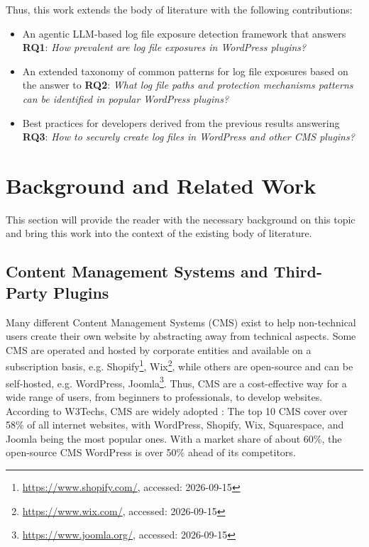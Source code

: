 \documentclass[sigconf]{acmart}
\begin{document}
Thus, this work extends the body of literature with the following contributions:
\begin{itemize}
    \item An agentic LLM-based log file exposure detection framework that answers \textbf{RQ1}: \emph{How prevalent are log file exposures in WordPress plugins?}
    \item An extended taxonomy of common patterns for log file exposures based on the answer to \textbf{RQ2}: \emph{What log file paths and protection mechanisms patterns can be identified in popular WordPress plugins?}
    \item Best practices for developers derived from the previous results answering \textbf{RQ3}: \emph{How to securely create log files in WordPress and other CMS plugins?}
\end{itemize}



\section{Background and Related Work}\label{sec:backgroundrelwork}
This section will provide the reader with the necessary background on this topic and bring this work into the context of the existing body of literature.

\subsection{Content Management Systems and Third-Party Plugins}
Many different Content Management Systems (CMS) exist to help non-technical users create their own website by abstracting away from technical aspects.
Some CMS are operated and hosted by corporate entities and available on a subscription basis, e.g. Shopify\footnote{\url{https://www.shopify.com/}, accessed: 2026-09-15}, Wix\footnote{\url{https://www.wix.com/}, accessed: 2026-09-15}, while others are open-source and can be self-hosted, e.g. WordPress, Joomla\footnote{\url{https://www.joomla.org/}, accessed: 2026-09-15}.
Thus, CMS are a cost-effective way for a wide range of users, from beginners to professionals, to develop websites. 
According to W3Techs, CMS are widely adopted \cite{w3techs2026cms}: The top 10 CMS cover over 58\% of all internet websites, with WordPress, Shopify, Wix, Squarespace, and Joomla being the most popular ones. 
With a market share of about 60\%, the open-source CMS WordPress is over 50\% ahead of its competitors.
\end{document}
